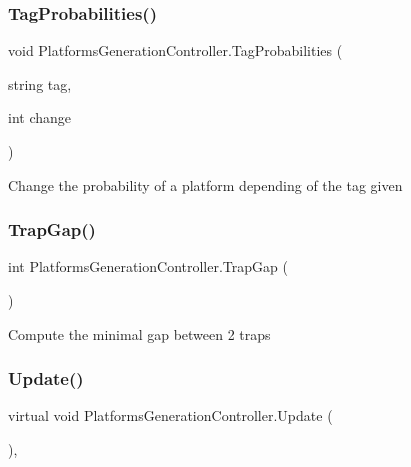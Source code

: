 \subsubsection{\texorpdfstring{Tag\+Probabilities()}{TagProbabilities()}}
{\footnotesize\ttfamily void Platforms\+Generation\+Controller.\+Tag\+Probabilities (\begin{DoxyParamCaption}\item[{string}]{tag,  }\item[{int}]{change }\end{DoxyParamCaption})\hspace{0.3cm}{\ttfamily [protected]}}

Change the probability of a platform depending of the tag given \mbox{\label{class_platforms_generation_controller_a24c92b696b3dfefb3ea9b0e554fe70d3}} 
\subsubsection{\texorpdfstring{Trap\+Gap()}{TrapGap()}}
{\footnotesize\ttfamily int Platforms\+Generation\+Controller.\+Trap\+Gap (\begin{DoxyParamCaption}{ }\end{DoxyParamCaption})\hspace{0.3cm}{\ttfamily [protected]}}

Compute the minimal gap between 2 traps \mbox{\label{class_platforms_generation_controller_ad014a93027f02d91fb93698b8f872606}} 
\subsubsection{\texorpdfstring{Update()}{Update()}}
{\footnotesize\ttfamily virtual void Platforms\+Generation\+Controller.\+Update (\begin{DoxyParamCaption}{ }\end{DoxyParamCaption})\hspace{0.3cm}{\ttfamily [protected]}, {\ttfamily [virtual]}}

